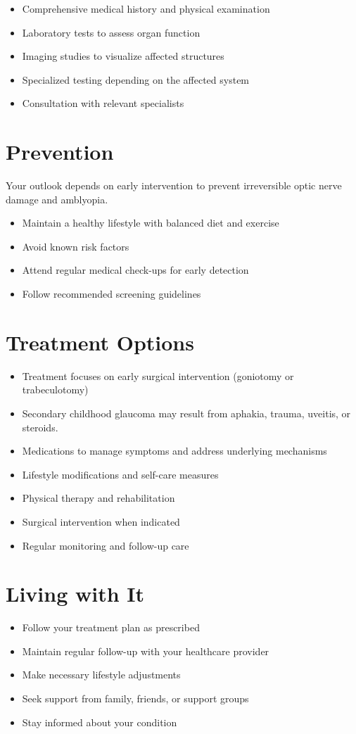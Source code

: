 \begin{itemize}[noitemsep]
  \item Comprehensive medical history and physical examination
  \item Laboratory tests to assess organ function
  \item Imaging studies to visualize affected structures
  \item Specialized testing depending on the affected system
  \item Consultation with relevant specialists
\end{itemize}
\section{Prevention}
Your outlook depends on early intervention to prevent irreversible optic nerve damage and amblyopia.

\begin{itemize}[noitemsep]
  \item Maintain a healthy lifestyle with balanced diet and exercise
  \item Avoid known risk factors
  \item Attend regular medical check-ups for early detection
  \item Follow recommended screening guidelines
\end{itemize}
\section{Treatment Options}
\begin{itemize}[noitemsep]
  \item Treatment focuses on early surgical intervention (goniotomy or trabeculotomy)
  \item Secondary childhood glaucoma may result from aphakia, trauma, uveitis, or steroids.
  \item Medications to manage symptoms and address underlying mechanisms
  \item Lifestyle modifications and self-care measures
  \item Physical therapy and rehabilitation
  \item Surgical intervention when indicated
  \item Regular monitoring and follow-up care
\end{itemize}
\section{Living with It}
\begin{itemize}[noitemsep]
  \item Follow your treatment plan as prescribed
  \item Maintain regular follow-up with your healthcare provider
  \item Make necessary lifestyle adjustments
  \item Seek support from family, friends, or support groups
  \item Stay informed about your condition
\end{itemize}
